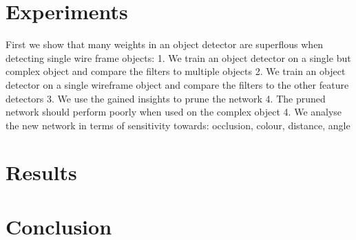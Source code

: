 \section{Experiments}

First we show that many weights in an object detector are superflous when detecting single wire frame objects:
1. We train an object detector on a single but complex object and compare the filters to multiple objects
2. We train an object detector on a single wireframe object and compare the filters to the other feature detectors
3. We use the gained insights to prune the network 
4. The pruned network should perform poorly when used on the complex object
4. We analyse the new network in terms of sensitivity towards: occlusion, colour, distance, angle

\section{Results}

\section{Conclusion}